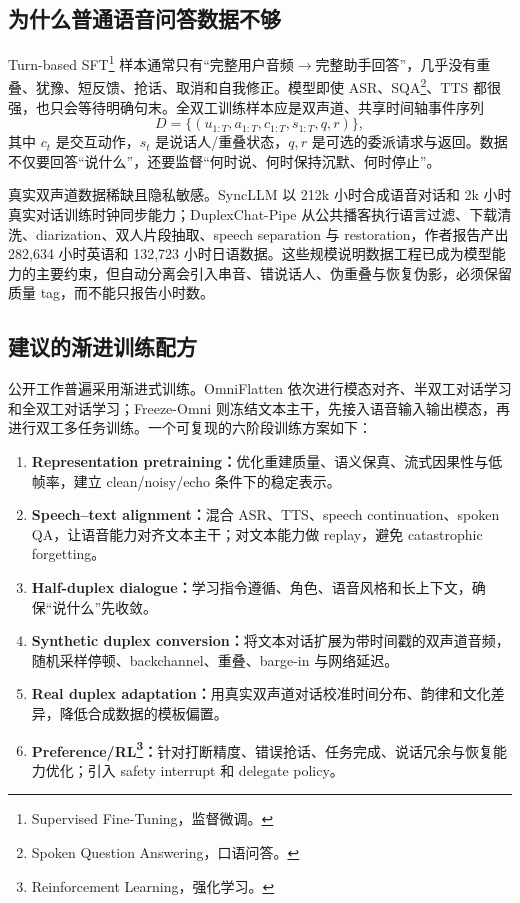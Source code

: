 \documentclass[UTF8,fontset=none,a4paper,10pt]{ctexart}
\begin{document}
\subsection{为什么普通语音问答数据不够}

Turn-based SFT\footnote{Supervised Fine-Tuning，监督微调。} 样本通常只有“完整用户音频$\to$完整助手回答”，几乎没有重叠、犹豫、短反馈、抢话、取消和自我修正。模型即使 ASR、SQA\footnote{Spoken Question Answering，口语问答。}、TTS 都很强，也只会等待明确句末。全双工训练样本应是双声道、共享时间轴事件序列
\begin{equation}
D=\{(u_{1:T},a_{1:T},c_{1:T},s_{1:T},q,r)\},
\end{equation}
其中 $c_t$ 是交互动作，$s_t$ 是说话人/重叠状态，$q,r$ 是可选的委派请求与返回。数据不仅要回答“说什么”，还要监督“何时说、何时保持沉默、何时停止”。

真实双声道数据稀缺且隐私敏感。SyncLLM 以 212k 小时合成语音对话和 2k 小时真实对话训练时钟同步能力\cite{zh:veluri2024syncllm}；DuplexChat-Pipe 从公共播客执行语言过滤、下载清洗、diarization、双人片段抽取、speech separation 与 restoration，作者报告产出 282,634 小时英语和 132,723 小时日语数据\cite{zh:nakata2026duplexchat}。这些规模说明数据工程已成为模型能力的主要约束，但自动分离会引入串音、错说话人、伪重叠与恢复伪影，必须保留质量 tag，而不能只报告小时数。

\subsection{建议的渐进训练配方}

公开工作普遍采用渐进式训练。OmniFlatten 依次进行模态对齐、半双工对话学习和全双工对话学习\cite{zh:zhang2024omniflatten}；Freeze-Omni 则冻结文本主干，先接入语音输入输出模态，再进行双工多任务训练\cite{zh:wang2024freezeomni}。一个可复现的六阶段训练方案如下：

\begin{enumerate}
  \item \textbf{Representation pretraining：}优化重建质量、语义保真、流式因果性与低帧率，建立 clean/noisy/echo 条件下的稳定表示。
  \item \textbf{Speech--text alignment：}混合 ASR、TTS、speech continuation、spoken QA，让语音能力对齐文本主干；对文本能力做 replay，避免 catastrophic forgetting。
  \item \textbf{Half-duplex dialogue：}学习指令遵循、角色、语音风格和长上下文，确保“说什么”先收敛。
  \item \textbf{Synthetic duplex conversion：}将文本对话扩展为带时间戳的双声道音频，随机采样停顿、backchannel、重叠、barge-in 与网络延迟。
  \item \textbf{Real duplex adaptation：}用真实双声道对话校准时间分布、韵律和文化差异，降低合成数据的模板偏置。
  \item \textbf{Preference/RL\footnote{Reinforcement Learning，强化学习。}：}针对打断精度、错误抢话、任务完成、说话冗余与恢复能力优化；引入 safety interrupt 和 delegate policy。
\end{enumerate}
\end{document}
